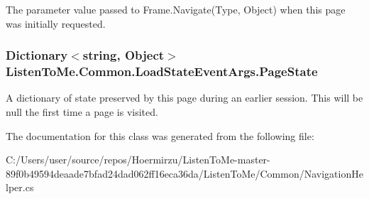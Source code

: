 The parameter value passed to Frame.\+Navigate(\+Type, Object) when this page was initially requested. 

\subsubsection[{\texorpdfstring{Page\+State}{PageState}}]{\setlength{\rightskip}{0pt plus 5cm}Dictionary$<$string, Object$>$ Listen\+To\+Me.\+Common.\+Load\+State\+Event\+Args.\+Page\+State\hspace{0.3cm}{\ttfamily [get]}}\hypertarget{class_listen_to_me_1_1_common_1_1_load_state_event_args_a2161ed99554b07abe1f6c743db81835e}{}\label{class_listen_to_me_1_1_common_1_1_load_state_event_args_a2161ed99554b07abe1f6c743db81835e}


A dictionary of state preserved by this page during an earlier session. This will be null the first time a page is visited. 



The documentation for this class was generated from the following file\+:\begin{DoxyCompactItemize}
\item 
C\+:/\+Users/user/source/repos/\+Hoermirzu/\+Listen\+To\+Me-\/master-\/89f0b49594deaade7bfad24dad062ff16eca36da/\+Listen\+To\+Me/\+Common/Navigation\+Helper.\+cs\end{DoxyCompactItemize}
